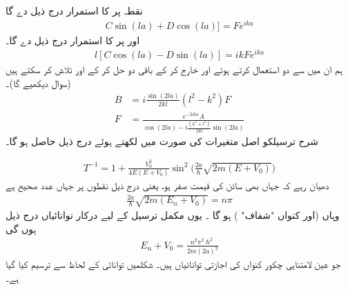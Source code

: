 نقطہ  پر کا استمرار درج ذیل دے گا 
\begin{align}\label{مساوات_شروڈنگر_سی}
C\sin (la)+D\cos(la)]=Fe^{ika} 
\end{align}
اور  پر  کا استمرار درج ذیل  دے گا۔
\begin{align}\label{مساوات_شروڈنگر_ڈی}
l[C\cos(la)-D\sin(la)]=ikFe^{ika} 
\end{align}
 ہم ان میں سے دو  استعمال کرتے ہوئے     اور   خارج کر کے باقی دو  حل کر کے   اور  تلاش کر سکتے ہیں (سوال    دیکھیے گا)۔
\begin{align}
B&=i\frac{\sin(2la)}{2kl}(l^{2}-k^{2})F \label{مساوات_شروڈنگر_بی}\\
F&=\frac{e^{-2ika}A}{\cos(2la)-i\frac{(k^{2}+l^{2})}{2kl}\sin(2la)}\label{مساوات_شروڈنگر_ایف}
\end{align}
  شرح ترسیلکو   اصل متغیرات کی صورت    میں لکھتے ہوئے  درج ذیل  حاصل ہو گا۔

\begin{align}\label{مساوات_شروڈنگر_ترسیلی_حل}
T^{-1}=1+\frac{V_{0}^{2}}{4E(E+V_{0})}\sin^{2}\big(\frac{2a}{\hslash}\sqrt{2m(E+V_{0})} \big) 
 \end{align}
 دھیان رہے کہ  جہاں بھی سائن کی قیمت صفر ہو، یعنی درج ذیل نقطوں پر جہاں  عدد صحیح ہے 
 \begin{align}
 \frac{2a}{\hslash}\sqrt{2m(E_{n}+V_{0})}=n\pi 
 \end{align}
  وہاں   (اور کنواں "شفاف" )   ہو گا  ۔ یوں مکمل ترسیل کے لیے درکار توانائیاں  درج ذیل ہوں گی
\begin{align}
E_{n}+V_{0}=\frac{n^{2}\pi^{2}\hslash^{2}}{2m(2a)^{2}} 
\end{align}
 جو عین لامتناہی چکور  کنواں کی اجازتی توانائیاں ہیں۔  شکلمیں توانائی  کے لحاظ سے   ترسیم کیا گیا ہے۔



